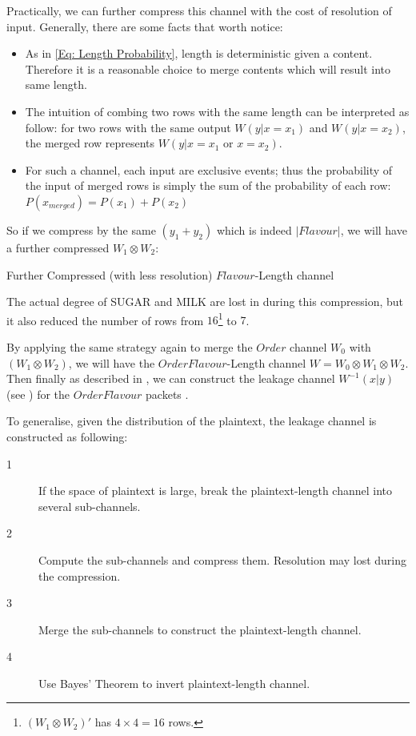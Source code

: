 \begin{example}
Practically, we can further compress this channel with the cost of resolution of input. Generally, there are some facts that worth notice:
\begin{itemize}
\item As in \eqref{Eq: Length Probability},  length is deterministic given a content. Therefore it is a reasonable choice to merge contents which will result into same length.
\item The intuition of combing two rows with the same length can be interpreted as follow: for two rows with the same output $W(y| x=x_1)$ and $W(y|x=x_2)$, the merged row represents $W(y|x=x_1 \text{ or } x = x_2 )$.
\item For such a channel, each input are exclusive events; thus the probability of the input of merged rows is simply the sum of the probability of each row: $P(x_{merged}) = P(x_1) + P(x_2)$
\end{itemize} 

So if we compress  by the same $(y_1 + y_2)$ which is indeed $|Flavour|$, we will have a further compressed $W_1 \otimes W_2$:

\begin{table}[H]
\begin{center}
{}
\end{center}
\caption{Further Compressed (with less resolution) $Flavour$-Length channel }
\label{Tbl: Further Compressed Flavour}
\end{table}

The actual degree of SUGAR and MILK are lost in  during this compression, but it also reduced the number of rows from $16$\footnote{$(W_1 \otimes W_2)\prime$ has $4 \times 4 = 16$ rows.} to $7$.

By applying the same strategy again to merge the $Order$ channel $W_0$ with $(W_1 \otimes W_2)$, we will have the $OrderFlavour$-Length channel $W = W_0 \otimes W_1 \otimes W_2$. Then finally as described in , we can construct the leakage channel $W^{-1}(x|y)$ (see ) for the $OrderFlavour$ packets .
\end{example}

To generalise, given the distribution of the plaintext, the leakage channel is constructed as following:
\begin{description}
\item[1] If the space of plaintext is large, break the plaintext-length channel into several sub-channels.
\item[2] Compute the sub-channels and compress them. Resolution may lost during the compression.
\item[3] Merge the sub-channels to construct the plaintext-length channel.
\item[4] Use Bayes’ Theorem to invert plaintext-length channel.
\end{description}


